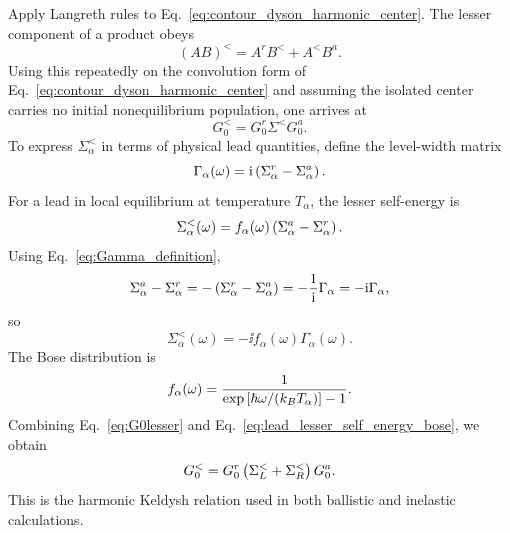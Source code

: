 Apply Langreth rules to Eq.~\eqref{eq:contour_dyson_harmonic_center}. The lesser component of a product obeys
\begin{equation}
    (AB)^< = A^r B^< + A^< B^a.
    \label{eq:langreth_product_rule}
\end{equation}
Using this repeatedly on the convolution form of Eq.~\eqref{eq:contour_dyson_harmonic_center} and assuming the isolated center carries no initial nonequilibrium population, one arrives at
\begin{equation}
    G_0^< = G_0^r \Sigma^< G_0^a.
    \label{eq:G0lesser}
\end{equation}
To express $\Sigma_\alpha^<$ in terms of physical lead quantities, define the level-width matrix
\begin{equation}
    \Gamma_\alpha(\omega) = \mathrm{i}\left( \Sigma_\alpha^r - \Sigma_\alpha^a \right).
    \label{eq:Gamma_definition}
\end{equation}
For a lead in local equilibrium at temperature $T_\alpha$, the lesser self-energy is
\begin{equation}
    \Sigma_\alpha^<(\omega) = f_\alpha(\omega)\left( \Sigma_\alpha^a - \Sigma_\alpha^r \right).
\end{equation}
Using Eq.~\eqref{eq:Gamma_definition},
\begin{equation}
    \Sigma_\alpha^a - \Sigma_\alpha^r = -\left( \Sigma_\alpha^r - \Sigma_\alpha^a \right) = -\frac{1}{\mathrm{i}}\Gamma_\alpha = -\mathrm{i}\Gamma_\alpha,
\end{equation}
so
\begin{equation}
    \Sigma_\alpha^<(\omega) = -\ii f_\alpha(\omega)\Gamma_\alpha(\omega).
    \label{eq:lead_lesser_self_energy_bose}
\end{equation}
The Bose distribution is
\begin{equation}
    f_\alpha(\omega) = \frac{1}{\exp\left[ \hbar\omega/(k_B T_\alpha) \right] - 1}.
    \label{eq:bose_distribution}
\end{equation}
Combining Eq.~\eqref{eq:G0lesser} and Eq.~\eqref{eq:lead_lesser_self_energy_bose}, we obtain
\begin{equation}
    G_0^< = G_0^r\left( \Sigma_L^< + \Sigma_R^< \right)G_0^a.
    \label{eq:harmonic_lesser_final}
\end{equation}
This is the harmonic Keldysh relation used in both ballistic and inelastic calculations.

